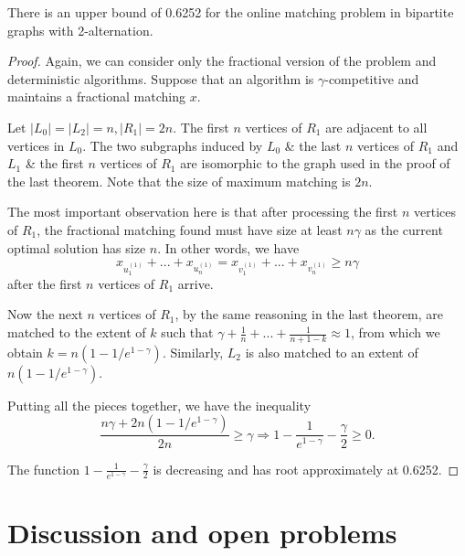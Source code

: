 \documentclass{article}
\newcommand{\yajun}[1]{{\color{red}{#1}}}
\begin{document}
\begin{proposition}
There is an upper bound of 0.6252 for the online matching problem in bipartite graphs with 2-alternation.
\end{proposition}
\begin{proof}
Again, we can consider only the fractional version of the problem and deterministic algorithms. Suppose that an algorithm is $\gamma$-competitive and maintains a fractional matching $x$.

Let $|L_0|=|L_2|=n,|R_1|=2n$. The first $n$ vertices of $R_1$ are adjacent to all vertices in $L_0$. The two subgraphs induced by $L_0$ \& the last $n$ vertices of $R_1$ and $L_1$ \& the first $n$ vertices of $R_1$ are isomorphic to the graph used in the proof of the last theorem. Note that the size of maximum matching is $2n$.

The most important observation here is that after processing the first $n$ vertices of $R_1$, the fractional matching found must have size at least $n\gamma$ as the current optimal solution has size $n$. In other words, we have $$x_{u_{1}^{(1)}}+...+x_{u_{n}^{(1)}}=x_{v_{1}^{(1)}}+...+x_{v_{n}^{(1)}}\geq n\gamma$$after the first $n$ vertices of $R_1$ arrive.

Now the next $n$ vertices of $R_1$, by the same reasoning in the last theorem, are matched to the extent of $k$ such that $\gamma + \frac{1}{n}+...+\frac{1}{n+1-k}\approx 1$, from which we obtain $k=n(1-1/e^{1-\gamma})$. Similarly, $L_2$ is also matched to an extent of $n(1-1/e^{1-\gamma})$.

Putting all the pieces together, we have the inequality $$\frac{n\gamma + 2n(1-1/e^{1-\gamma})}{2n}\geq \gamma\Rightarrow 1-\frac{1}{e^{1-\gamma}}-\frac{\gamma}{2}\geq0.$$

The function $1-\frac{1}{e^{1-\gamma}}-\frac{\gamma}{2}$ is decreasing and has root approximately at 0.6252.
\end{proof}




\section{Discussion and open problems}
%
\end{document}
